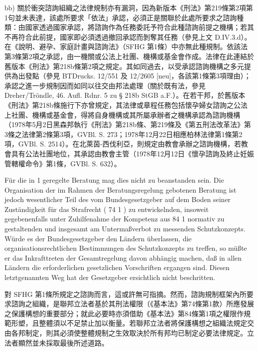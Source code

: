 \documentclass[12pt]{article}
\begin{document}
\begin{transpara}
bb) 關於衝突諮詢組織之法律規制亦有漏洞，因為新版本《刑法》第219條第2項第1句並未表達，該處所要求「依法」承認，必須正是關聯於此處所要求之諮詢種類：由國家透過國家承認，將諮詢作為任務委託予符合此種諮詢前提之機構；若其不再符合此前提，國家即必須透過撤回承認而剝奪其任務（參見上文 D.IV.3.d）。在《說明、避孕、家庭計畫與諮詢法》（SFHG 第1條）中亦無此種規制。依該法第3條第2項之承認，由一機關或公法上社團、機構或基金會作成。法律在此連結於舊版本《刑法》第218b條第2項之規定。其如同過去，以受承認諮詢機構之多元提供為出發點（參見 BTDrucks. 12/551 及 12/2605 [neu]，各該第1條第3項理由）；承認之進一步規制因而如同以往交由邦法處理（關於既有法，參見 Dreher/Tröndle, 46. Aufl. Rdnr. 5 zu § 218b StGB a.F.）。在若干邦，於舊版本《刑法》第218b條施行下亦曾規定，其法律或章程任務包括懷孕婦女諮詢之公法上社團、機構或基金會，得將自身機構或其所屬承辦者之機構承認為諮詢機構（1978年5月2日黑森邦執行《刑法》第218b條、第219條及《第五刑法改革法》第3條之法律第2條第3項，GVBl. S. 273；1978年12月22日相應柏林法律第1條第2項，GVBl. S. 2514）。在北萊茵-西伐利亞，則規定由教會承辦之諮詢機構，若教會具有公法社團地位，其承認由教會主管（1978年12月12日《懷孕諮詢及終止妊娠管轄權命令》第1條，GVBl. S. 632）。
\end{transpara}

\begin{sourcepara}[title={原文E.173}]
Für die in \abbrArt{} 1 \abbrSFHG{} geregelte Beratung mag dies nicht zu beanstanden sein. Die Organisation der im Rahmen der Beratungsregelung gebotenen Beratung ist jedoch wesentlicher Teil des vom Bundesgesetzgeber auf dem Boden seiner Zuständigkeit für das Strafrecht (\abbrArt{} 74 \abbrNr{} 1 \abbrGG{}\ggfnArtSeventyFourOneDE{}) zu entwickelnden, insoweit gegebenenfalls unter Zuhilfenahme der Kompetenz aus \abbrArt{} 84 \abbrAbs{} 1 \abbrGG{}\ggfnArtEightyFourOneDE{} normativ zu gestaltenden und insgesamt am Untermaßverbot zu messenden Schutzkonzepts. Würde es der Bundesgesetzgeber den Ländern überlassen, die organisationsrechtlichen Bestimmungen des Schutzkonzepts zu treffen, so müßte er das Inkrafttreten der Gesamtregelung davon abhängig machen, daß in allen Ländern die erforderlichen gesetzlichen Vorschriften ergangen sind. Diesen letztgenannten Weg hat der Gesetzgeber ersichtlich nicht beschritten.
\end{sourcepara}
\begin{transpara}
對 SFHG 第1條所規定之諮詢而言，這或許無可指摘。然而，諮詢規制框架內所要求諮詢之組織，是聯邦立法者基於其刑法權限（《基本法》第74條第1款\ggfnArtSeventyFourOneZH{}）所應發展之保護構想的重要部分；就此必要時亦須借助《基本法》第84條第1項\ggfnArtEightyFourOneZH{}之權限作規範形塑，且整體須以不足禁止加以衡量。若聯邦立法者將保護構想之組織法規定交由各邦制定，則其必須使整體規制之生效取決於所有邦均已制定必要法律規定。立法者顯然並未採取最後所述道路。
\end{transpara}
\end{document}
